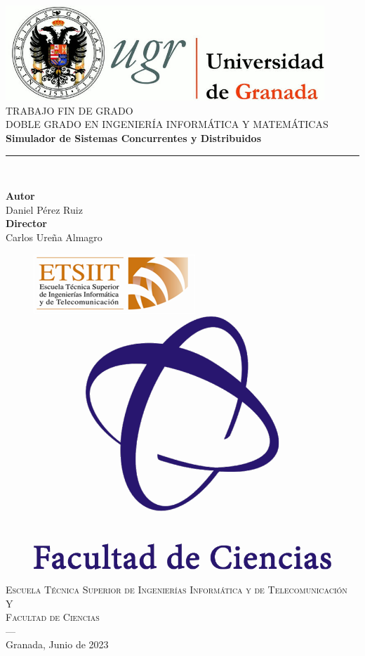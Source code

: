 \begin{titlepage}
\newlength{\centeroffset}
\setlength{\centeroffset}{-0.5\oddsidemargin}
\addtolength{\centeroffset}{0.5\evensidemargin}
\thispagestyle{empty}

\noindent\hspace*{\centeroffset}\begin{minipage}{\textwidth}

\centering
\includegraphics[width=0.9\textwidth]{logos/logo_ugr.jpg}\\[1.4cm]

\textsc{ \Large TRABAJO FIN DE GRADO\\[0.2cm]}
\small \textsc{DOBLE GRADO EN INGENIERÍA INFORMÁTICA Y MATEMÁTICAS}\\[1cm]

{\Huge\bfseries Simulador de Sistemas Concurrentes y Distribuidos \\}
\noindent\rule[-1ex]{\textwidth}{3pt}\\[3.5ex]
\end{minipage}

\vspace{1.5cm}
\noindent\hspace*{\centeroffset}
\begin{minipage}{\textwidth}
\centering

\textbf{Autor}\\ {Daniel Pérez Ruiz}\\[2.5ex]
\textbf{Director}\\ {Carlos Ureña Almagro}\\[1.2cm]

\begin{figure}[H]
  \centering
  \includegraphics[width=.3\textwidth]{logos/etsiit_logo.png}\hspace{0.2\textwidth}
  \includegraphics[width=.2\textwidth]{logos/ciencias-logo.png}
\end{figure}
\textsc{Escuela Técnica Superior de Ingenierías Informática y de Telecomunicación}\\[0.1cm]
\textsc{Y}\\
\textsc{Facultad de Ciencias}\\
\textsc{---}\\
Granada, Junio de 2023
\end{minipage}
\end{titlepage}
